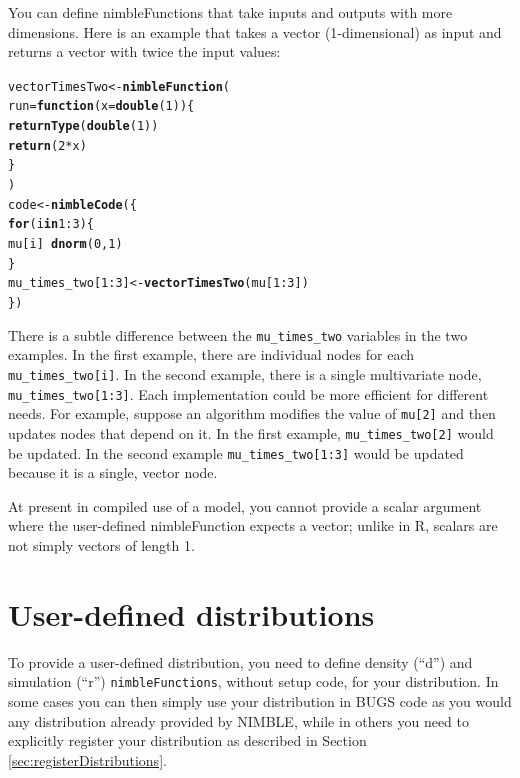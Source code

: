 \documentclass[12pt,oneside]{book}\usepackage[]{graphicx}\usepackage[]{color}
\makeatletter
\newcommand{\hlnum}[1]{\textcolor[rgb]{0.686,0.059,0.569}{#1}}%
\newcommand{\hlopt}[1]{\textcolor[rgb]{0,0,0}{#1}}%
\newcommand{\hlstd}[1]{\textcolor[rgb]{0.345,0.345,0.345}{#1}}%
\newcommand{\hlkwa}[1]{\textcolor[rgb]{0.161,0.373,0.58}{\textbf{#1}}}%
\newcommand{\hlkwb}[1]{\textcolor[rgb]{0.69,0.353,0.396}{#1}}%
\newcommand{\hlkwc}[1]{\textcolor[rgb]{0.333,0.667,0.333}{#1}}%
\newcommand{\hlkwd}[1]{\textcolor[rgb]{0.737,0.353,0.396}{\textbf{#1}}}%
\newenvironment{kframe}{%
 \def\at@end@of@kframe{}%
 \ifinner\ifhmode%
  \def\at@end@of@kframe{\end{minipage}}%
  \begin{minipage}{\columnwidth}%
 \fi\fi%
 \def\FrameCommand##1{\hskip\@totalleftmargin \hskip-\fboxsep
 \colorbox{shadecolor}{##1}\hskip-\fboxsep
     \hskip-\linewidth \hskip-\@totalleftmargin \hskip\columnwidth}%
 \MakeFramed {\advance\hsize-\width
   \@totalleftmargin\z@ \linewidth\hsize
   \@setminipage}}%
 {\par\unskip\endMakeFramed%
 \at@end@of@kframe}
\newenvironment{knitrout}{}{} %
\def\cd#1{\texttt{#1}}
\makeatother
\begin{document}
You can define nimbleFunctions that take inputs and outputs with
more dimensions.  Here is an example that takes a vector
(1-dimensional) as input and returns a vector with twice the input
values:
\begin{knitrout}
\color{fgcolor}\begin{kframe}
\begin{alltt}
\hlstd{vectorTimesTwo}  \hlkwb{<-} \hlkwd{nimbleFunction}\hlstd{(}
    \hlkwc{run} \hlstd{=} \hlkwa{function}\hlstd{(}\hlkwc{x} \hlstd{=} \hlkwd{double}\hlstd{(}\hlnum{1}\hlstd{)) \{}
        \hlkwd{returnType}\hlstd{(}\hlkwd{double}\hlstd{(}\hlnum{1}\hlstd{))}
        \hlkwd{return}\hlstd{(}\hlnum{2}\hlopt{*}\hlstd{x)}
    \hlstd{\}}
    \hlstd{)}
\hlstd{code} \hlkwb{<-} \hlkwd{nimbleCode}\hlstd{(\{}
    \hlkwa{for}\hlstd{(i} \hlkwa{in} \hlnum{1}\hlopt{:}\hlnum{3}\hlstd{) \{}
        \hlstd{mu[i]} \hlopt{~} \hlkwd{dnorm}\hlstd{(}\hlnum{0}\hlstd{,} \hlnum{1}\hlstd{)}
    \hlstd{\}}
    \hlstd{mu_times_two[}\hlnum{1}\hlopt{:}\hlnum{3}\hlstd{]} \hlkwb{<-} \hlkwd{vectorTimesTwo}\hlstd{(mu[}\hlnum{1}\hlopt{:}\hlnum{3}\hlstd{])}
\hlstd{\})}
\end{alltt}
\end{kframe}
\end{knitrout}

There is a subtle difference between the \cd{mu\_times\_two} variables in the two examples.  In the first example, there are individual nodes for each \cd{mu\_times\_two[i]}. In the second example, there is a single multivariate node, \cd{mu\_times\_two[1:3]}. Each implementation could be more efficient for different needs.  For example, suppose an algorithm modifies the value of \cd{mu[2]} and then updates nodes that depend on it.  In the first example, \cd{mu\_times\_two[2]} would be updated.  In the second example \cd{mu\_times\_two[1:3]} would be updated because it is a single, vector node.

At present in compiled use of a model, you cannot provide a scalar argument where the user-defined nimbleFunction expects a vector; unlike in R, scalars are not simply vectors of length 1.


\section{User-defined distributions}
\label{sec:user-distributions}

To provide a user-defined distribution, you need to define density
(``d'') and simulation (``r'') \cd{nimbleFunctions}, without setup
code, for your distribution. In some cases you can then
simply use your distribution in BUGS code as you would any
distribution already provided by NIMBLE, while in others
you need to explicitly register your distribution as described in Section \ref{sec:registerDistributions}.  
\end{document}
